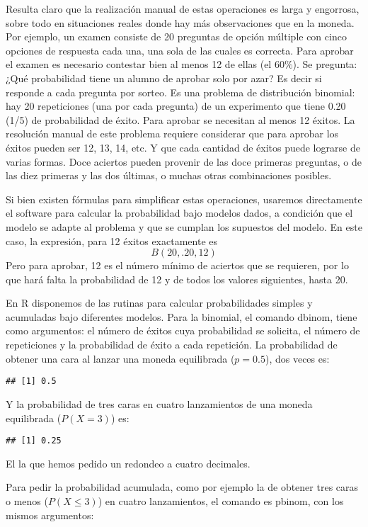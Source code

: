 \documentclass[]{article}
\begin{document}
Resulta claro que la realización manual de estas operaciones es larga y
engorrosa, sobre todo en situaciones reales donde hay más observaciones
que en la moneda. Por ejemplo, un examen consiste de 20 preguntas de
opción múltiple con cinco opciones de respuesta cada una, una sola de
las cuales es correcta. Para aprobar el examen es necesario contestar
bien al menos 12 de ellas (el 60\%). Se pregunta: ¿Qué probabilidad
tiene un alumno de aprobar solo por azar? Es decir si responde a cada
pregunta por sorteo. Es una problema de distribución binomial: hay 20
repeticiones (una por cada pregunta) de un experimento que tiene 0.20
(1/5) de probabilidad de éxito. Para aprobar se necesitan al menos 12
éxitos. La resolución manual de este problema requiere considerar que
para aprobar los éxitos pueden ser 12, 13, 14, etc. Y que cada cantidad
de éxitos puede lograrse de varias formas. Doce aciertos pueden provenir
de las doce primeras preguntas, o de las diez primeras y las dos
últimas, o muchas otras combinaciones posibles.

Si bien existen fórmulas para simplificar estas operaciones, usaremos
directamente el software para calcular la probabilidad bajo modelos
dados, a condición que el modelo se adapte al problema y que se cumplan
los supuestos del modelo. En este caso, la expresión, para 12 éxitos
exactamente es \[B(20, .20, 12)\] Pero para aprobar, 12 es el número
mínimo de aciertos que se requieren, por lo que hará falta la
probabilidad de 12 y de todos los valores siguientes, hasta 20.

En R disponemos de las rutinas para calcular probabilidades simples y
acumuladas bajo diferentes modelos. Para la binomial, el comando dbinom,
tiene como argumentos: el número de éxitos cuya probabilidad se
solicita, el número de repeticiones y la probabilidad de éxito a cada
repetición. La probabilidad de obtener una cara al lanzar una moneda
equilibrada (\(p=0.5\)), dos veces es:

\begin{verbatim}
## [1] 0.5
\end{verbatim}

Y la probabilidad de tres caras en cuatro lanzamientos de una moneda
equilibrada (\(P(X=3)\)) es:

\begin{verbatim}
## [1] 0.25
\end{verbatim}

El la que hemos pedido un redondeo a cuatro decimales.

Para pedir la probabilidad acumulada, como por ejemplo la de obtener
tres caras o menos (\(P(X\leq 3)\)) en cuatro lanzamientos, el comando
es pbinom, con los mismos argumentos:
\end{document}
